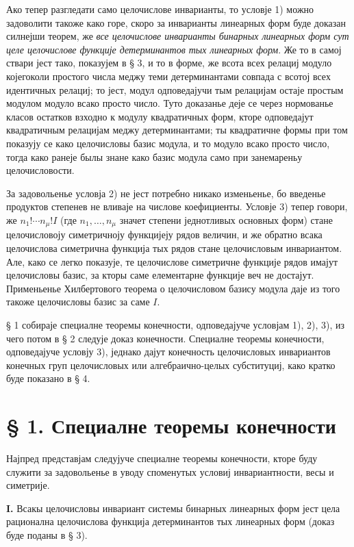 ﻿\documentclass[11pt]{article}
\begin{document}
Ако тепер разгледати само целочислове инварианты, то условје 1) можно задоволити такоже како горе, скоро за инварианты линеарных форм буде доказан силнејши теорем, же {\itshape все целочислове инварианты бинарных линеарных форм сут целе целочислове функције детерминантов тых линеарных форм}. Же то в самој ствари јест тако, показујем в § 3, и то в форме, же всота всех релациј модуло којегоколи простого числа меджу теми детерминантами совпада с всотој всех идентичных релациј; то јест, модул одповедајучи тым релацијам остаје простым модулом модуло всако просто число. Туто доказанье деје се через нормованье класов остатков взходно к модулу квадратичных форм, кторе одповедајут квадратичным релацијам меджу детерминантами; ты квадратичне формы при том показују се како целочисловы базис модула, и то модуло всако просто число, тогда како ранеје былы знане како базис модула само при занемареньу целочисловости.

За задовольенье условја 2) не јест потребно никако изменьенье, бо введенье продуктов степенев не вливаје на числове коефициенты. Условје 3) тепер говори, же \(n_1!\cdots n_\mu! I\) (где \(n_1,\ldots,n_\mu\) значет степени једнотливых основных форм) стане целочисловоју симетричноју функцијеју рядов величин, и же обратно всака целочислова симетрична функција тых рядов стане целочисловым инвариантом. Але, како се легко показује, те целочислове симетричне функције рядов имајут целочисловы базис, за кторы саме елементарне функције веч не достајут. Применьенье Хилбертового теорема о целочисловом базису модула даје из того такоже целочисловы базис за саме \(I\).

§ 1 собираје специалне теоремы конечности, одповедајуче условјам 1), 2), 3), из чего потом в § 2 следује доказ конечности. Специалне теоремы конечности, одповедајуче условју 3), једнако дајут конечность целочисловых инвариантов конечных груп целочисловых или алгебраично-целых субституциј, како кратко буде показано в § 4.

\section*{§ 1. Специалне теоремы конечности}

Најпред представјам следујуче специалне теоремы конечности, кторе буду служити за задовольенье в уводу споменутых условиј инвариантности, весы и симетрије.

\textbf{I.} Всакы целочисловы инвариант системы бинарных линеарных форм јест цела рационална целочислова функција детерминантов тых линеарных форм (доказ буде поданы в § 3).
\end{document}
